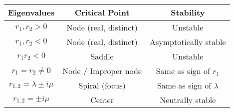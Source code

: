 




\renewcommand{\arraystretch}{1.1} %
\begin{tabular}{|c|c|c|}
\hline
\textbf{Eigenvalues} & \textbf{Critical Point} & \textbf{Stability} \\
\hline
$r_1, r_2 > 0$ & Node (real, distinct) & Unstable \\
$r_1, r_2 < 0$ & Node (real, distinct) & Asymptotically stable \\
$r_1 r_2 < 0$ & Saddle & Unstable \\
$r_1 = r_2 \neq 0$ & Node / Improper node & Same as sign of $r_1$ \\
$r_{1,2} = \lambda \pm i\mu$ & Spiral (focus) & Same as sign of $\lambda$ \\
$r_{1,2} = \pm i\mu$ & Center & Neutrally stable \\
\hline
\end{tabular}

